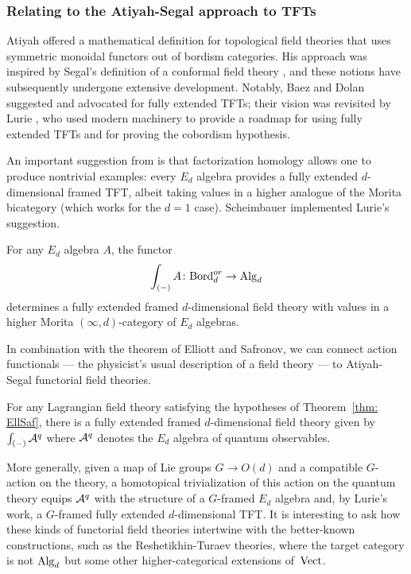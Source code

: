 \documentclass[11pt]{amsart}
\begin{document}
\subsubsection{Relating to the Atiyah-Segal approach to TFTs}
\label{sec: reln to functorial TFT}

Atiyah \cite{AtiTFT} offered a mathematical definition for topological field theories that uses symmetric monoidal functors out of bordism categories.
His approach was inspired by Segal's definition of a conformal field theory \cite{SegCFT},
and these notions have subsequently undergone extensive development.
Notably, Baez and Dolan \cite{BaeDol} suggested and advocated for fully extended TFTs; 
their vision was revisited by Lurie \cite{LurieTFT}, who used modern machinery to provide a roadmap for using fully extended TFTs and for proving the cobordism hypothesis.

An important suggestion from \cite{LurieTFT} is that factorization homology allows one to produce nontrivial examples: 
every $E_d$ algebra provides a fully extended $d$-dimensional framed TFT,
albeit taking values in a higher analogue of the Morita bicategory (which works for the $d=1$ case).
Scheimbauer \cite{Scheim} implemented Lurie's suggestion.

\begin{thm}
For any $E_d$ algebra $A$, the functor
\[
\int_{(-)} A \colon {\rm Bord}^{or}_d \to {\rm Alg}_d
\]
determines a fully extended framed $d$-dimensional field theory with values in a higher Morita $(\infty,d)$-category of $E_d$ algebras.
\end{thm}

In combination with the theorem of Elliott and Safronov, we can connect action functionals --- the physicist's usual description of a field theory --- to Atiyah-Segal functorial field theories.

\begin{cor}
\label{cor: EllSaf}
For any Lagrangian field theory satisfying the hypotheses of Theorem~\ref{thm: EllSaf}, 
there is a fully extended framed $d$-dimensional field theory 
given by $\int_{(-)} \mathcal A^q$ where $\mathcal A^q$ denotes the $E_d$ algebra of quantum observables.
\end{cor}

More generally, given a map of Lie groups $G \to O(d)$ and a compatible $G$-action on the theory, 
a homotopical trivialization of this action on the quantum theory equips $\mathcal A^q$ with the structure of a $G$-framed $E_d$ algebra and, by Lurie's work, a $G$-framed fully extended $d$-dimensional TFT.
It is interesting to ask how these kinds of functorial field theories intertwine with the better-known constructions,
such as the Reshetikhin-Turaev theories, 
where the target category is not ${\rm Alg}_d$ but some other higher-categorical extensions of~$\operatorname{Vect}$.
\end{document}

